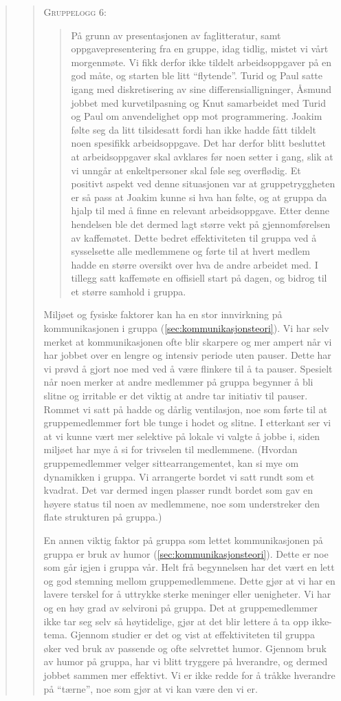 \begin{quote}
\begin{quote}
\textsc{Gruppelogg 6:}
\begin{quote}
På grunn av presentasjonen av faglitteratur, samt oppgavepresentering fra en gruppe,
idag tidlig, mistet vi vårt morgenmøte. Vi fikk derfor ikke tildelt arbeidsoppgaver på 
en god måte, og starten ble litt ``flytende''. Turid og Paul satte igang med diskretisering
av sine differensialligninger, Åsmund jobbet med kurvetilpasning og Knut samarbeidet
med Turid og Paul om anvendelighet opp mot programmering. Joakim følte seg da litt
tilsidesatt fordi han ikke hadde fått tildelt noen spesifikk arbeidsoppgave. Det har derfor
blitt besluttet at arbeidsoppgaver skal avklares før noen setter i gang, slik at vi unngår at                                           
enkeltpersoner skal føle seg overflødig. Et positivt aspekt ved denne situasjonen var at
gruppetryggheten er så pass at Joakim kunne si hva han følte, og at gruppa da hjalp til
med å finne en relevant arbeidsoppgave. Etter denne hendelsen ble det dermed lagt større vekt 
på gjennomførelsen av kaffemøtet. Dette bedret effektiviteten til gruppa ved å sysselsette 
alle medlemmene og førte til at hvert medlem hadde en større oversikt over hva de andre arbeidet
med. I tillegg satt kaffemøte en offisiell start på dagen, og bidrog til et større samhold i gruppa.
\end{quote}


Miljøet og fysiske faktorer kan ha en stor innvirkning på kommunikasjonen i
gruppa (\ref{sec:kommunikasjonsteori}). Vi har selv
merket at kommunikasjonen ofte blir skarpere og mer ampert når vi har jobbet over en lengre og
intensiv periode uten pauser. Dette har vi prøvd å gjort noe med ved å være flinkere til å ta
pauser. Spesielt når noen merker at andre medlemmer på gruppa begynner å bli slitne og irritable
er det viktig at andre tar initiativ til pauser. Rommet vi satt på hadde og dårlig ventilasjon,
noe som førte til at gruppemedlemmer fort ble tunge i hodet og slitne. I etterkant ser vi at
vi kunne vært mer selektive på lokale vi valgte å jobbe i, siden miljøet har mye å si for 
trivselen til medlemmene. (Hvordan gruppemedlemmer velger sittearrangementet, kan si mye om 
dynamikken i gruppa. Vi arrangerte bordet vi satt rundt som et kvadrat. Det var dermed ingen
plasser rundt bordet som gav en høyere status til noen av medlemmene, noe som understreker den 
flate strukturen på gruppa.)

En annen viktig faktor på gruppa som lettet kommunikasjonen på gruppa er bruk
av humor (\ref{sec:kommunikasjonsteori}). Dette er noe
som går igjen i gruppa vår. Helt frå begynnelsen har det vært en lett og god stemning mellom gruppemedlemmene. 
Dette gjør at vi har en lavere terskel for å uttrykke sterke meninger eller uenigheter. Vi har og en høy grad 
av selvironi på gruppa. Det at gruppemedlemmer ikke tar seg selv så høytidelige, gjør at det blir lettere å ta 
opp ikke-tema. Gjennom studier er det og vist at effektiviteten til gruppa øker ved bruk av passende og ofte 
selvrettet humor. Gjennom bruk av humor på gruppa, har vi blitt tryggere på hverandre, og dermed jobbet sammen 
mer effektivt. Vi er ikke redde for å tråkke hverandre på ``tærne'', noe som gjør at vi kan være den vi er. 


\end{quote}
\end{quote}
